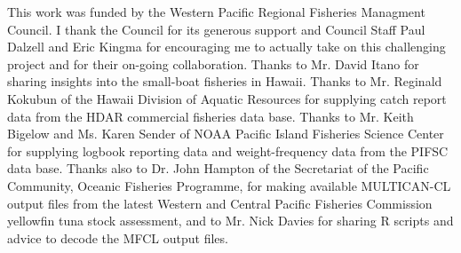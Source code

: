 \documentclass[12pt,letterpaper,twoside]{article}
\begin{document}
\vspace{4ex}
{}
This work was funded by the Western Pacific Regional Fisheries
Managment Council. I thank the Council for its generous support and
Council Staff Paul Dalzell and Eric Kingma for encouraging me to
actually take on this challenging project and for their on-going
collaboration.
Thanks to Mr. David Itano for sharing insights into the small-boat
fisheries in Hawaii.
Thanks to Mr. Reginald Kokubun of the Hawaii Division of Aquatic
Resources for supplying catch report data from the HDAR commercial
fisheries data base.
Thanks to Mr. Keith Bigelow and Ms. Karen Sender of NOAA Pacific
Island Fisheries Science Center for supplying logbook reporting data and
weight-frequency data from the PIFSC data base.
Thanks also to Dr. John Hampton of the Secretariat of the Pacific
Community, Oceanic Fisheries Programme, for making available
MULTICAN-CL output files from the latest Western and Central Pacific
Fisheries Commission yellowfin tuna stock assessment, and to Mr. Nick
Davies for sharing R scripts and advice to decode the MFCL output files.
\end{document}
